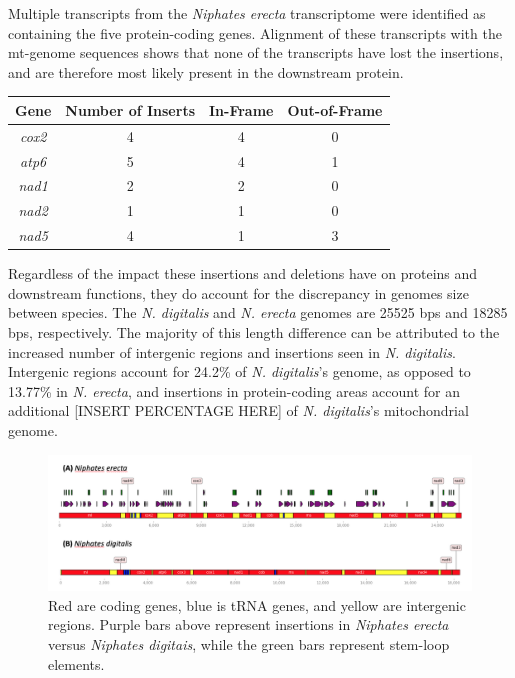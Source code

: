 \documentclass[../main.tex]{subfiles}
\begin{document}
Multiple transcripts from the \emph{Niphates erecta} transcriptome were identified as containing the five protein-coding genes. Alignment of these transcripts with the mt-genome sequences shows that none of the transcripts have lost the insertions, and are therefore most likely present in the downstream protein.

\begin{center}
\begin{tabular}{ |c|c|c|c| } 
 \hline
 \textbf{Gene}& \textbf{Number of Inserts} & \textbf{In-Frame} & \textbf{Out-of-Frame}\\
 \hline
 \emph{cox2}  & 4  & 4 & 0 \\
\hline
\emph{atp6} & 5 & 4 & 1 \\
\hline
\emph{nad1} & 2 & 2 & 0 \\
\hline
\emph{nad2} & 1 & 1 & 0 \\
\hline
\emph{nad5} & 4 & 1 & 3 \\
\hline
\end{tabular}
\end{center}

Regardless of the impact these insertions and deletions have on proteins and downstream functions, they do account for the discrepancy in genomes size between species. The \emph{N. digitalis} and \emph{N. erecta} genomes are 25525 bps and 18285 bps, respectively. The majority of this length difference can be attributed to the increased number of intergenic regions and insertions seen in \emph{N. digitalis}. Intergenic regions account for 24.2\% of \emph{N. digitalis}'s genome, as opposed to 13.77\% in \emph{N. erecta}, and insertions in protein-coding areas account for an additional [INSERT PERCENTAGE HERE] of \emph{N. digitalis}'s mitochondrial genome.

\begin{figure}[htp]
    \centering
    \includegraphics[width=1.0\textwidth]{Figures/figure 1.png}
    \caption{Red are coding genes, blue is tRNA genes, and yellow are intergenic regions. Purple bars above represent insertions in \emph{Niphates erecta} versus \emph{Niphates digitais}, while the green bars represent stem-loop elements.}
\end{figure}
\end{document}
